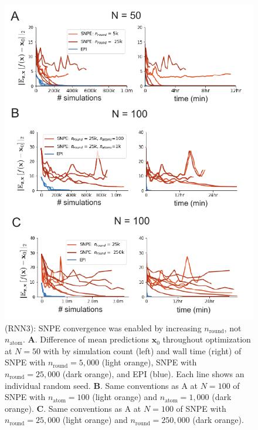 \documentclass[11pt]{article}
\begin{document}
\begin{figure}
\begin{center}
\includegraphics[scale=1.]{figures/figRNN3/figRNN3.pdf}
\end{center}
\caption{\small (RNN3): 
SNPE convergence was enabled by increasing $n_{\text{round}}$, not $n_{\text{atom}}$.
\textbf{A}. Difference of mean predictions $\mathbf{x}_0$ throughout optimization at $N=50$ with by simulation count (left) and wall time (right) of SNPE with $n_{\text{round}} = 5,000$ (light orange), SNPE with $n_{\text{round}} = 25,000$ (dark orange), and EPI (blue).
Each line shows an individual random seed.
\textbf{B}. Same conventions as A at $N=100$ of SNPE with $n_{\text{atom}} = 100$ (light orange) and $n_{\text{atom}} = 1,000$ (dark orange).
\textbf{C}. Same conventions as A at $N=100$ of SNPE with $n_{\text{round}} = 25,000$ (light orange) and $n_{\text{round}} = 250,000$ (dark orange).
}
\label{fig:RNN3}
\end{figure}
\end{document}
